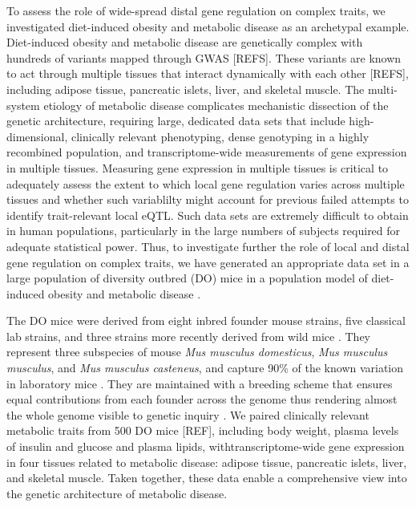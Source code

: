 \documentclass[
]{article}
\begin{document}
To assess the role of wide-spread distal gene regulation on complex
traits, we investigated diet-induced obesity and metabolic disease as an
archetypal example. Diet-induced obesity and metabolic disease are
genetically complex with hundreds of variants mapped through GWAS
{[}REFS{]}. These variants are known to act through multiple tissues
that interact dynamically with each other {[}REFS{]}, including adipose
tissue, pancreatic islets, liver, and skeletal muscle. The multi-system
etiology of metabolic disease complicates mechanistic dissection of the
genetic architecture, requiring large, dedicated data sets that include
high-dimensional, clinically relevant phenotyping, dense genotyping in a
highly recombined population, and transcriptome-wide measurements of
gene expression in multiple tissues. Measuring gene expression in
multiple tissues is critical to adequately assess the extent to which
local gene regulation varies across multiple tissues and whether such
variablilty might account for previous failed attempts to identify
trait-relevant local eQTL. Such data sets are extremely difficult to
obtain in human populations, particularly in the large numbers of
subjects required for adequate statistical power. Thus, to investigate
further the role of local and distal gene regulation on complex traits,
we have generated an appropriate data set in a large population of
diversity outbred (DO) mice \cite{pmid22892839} in a population model of
diet-induced obesity and metabolic disease \cite{pmid29567659}.

The DO mice were derived from eight inbred founder mouse strains, five
classical lab strains, and three strains more recently derived from wild
mice \cite{pmid22892839}. They represent three subspecies of mouse
\textit{Mus musculus domesticus}, \textit{Mus musculus musculus}, and
\textit{Mus musculus casteneus}, and capture 90\% of the known variation
in laboratory mice \cite{pmid31133439}. They are maintained with a
breeding scheme that ensures equal contributions from each founder
across the genome thus rendering almost the whole genome visible to
genetic inquiry \cite{pmid22892839}. We paired clinically relevant
metabolic traits from 500 DO mice {[}REF{]}, including body weight,
plasma levels of insulin and glucose and plasma lipids,
withtranscriptome-wide gene expression in four tissues related to
metabolic disease: adipose tissue, pancreatic islets, liver, and
skeletal muscle. Taken together, these data enable a comprehensive view
into the genetic architecture of metabolic disease.
\end{document}
